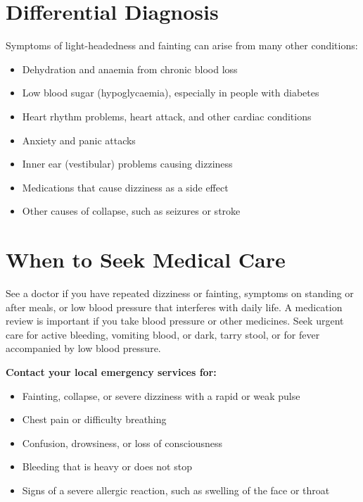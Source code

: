 \section*{Differential Diagnosis}
Symptoms of light-headedness and fainting can arise from many other conditions:

\begin{itemize}
    \item Dehydration and anaemia from chronic blood loss
    \item Low blood sugar (hypoglycaemia), especially in people with diabetes
    \item Heart rhythm problems, heart attack, and other cardiac conditions
    \item Anxiety and panic attacks
    \item Inner ear (vestibular) problems causing dizziness
    \item Medications that cause dizziness as a side effect
    \item Other causes of collapse, such as seizures or stroke
\end{itemize}

\section*{When to Seek Medical Care}
See a doctor if you have repeated dizziness or fainting, symptoms on standing or after meals, or low blood pressure that interferes with daily life. A medication review is important if you take blood pressure or other medicines. Seek urgent care for active bleeding, vomiting blood, or dark, tarry stool, or for fever accompanied by low blood pressure.

\textbf{Contact your local emergency services for:}
\begin{itemize}
    \item Fainting, collapse, or severe dizziness with a rapid or weak pulse
    \item Chest pain or difficulty breathing
    \item Confusion, drowsiness, or loss of consciousness
    \item Bleeding that is heavy or does not stop
    \item Signs of a severe allergic reaction, such as swelling of the face or throat
\end{itemize}

